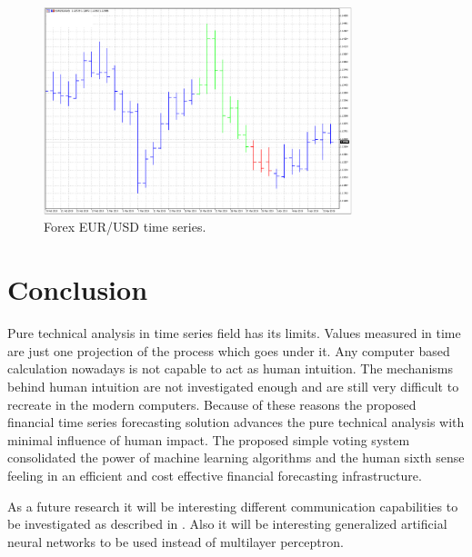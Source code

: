 \documentclass[runningheads]{llncs}
\begin{document}
\begin{figure}
\includegraphics[width=0.8\textwidth]{fig03.png}
\centering
\caption{Forex EUR/USD time series.} \label{fig03}
\end{figure}
\FloatBarrier

\section{Conclusion} \label{Conclusion}

Pure technical analysis in time series field has its limits. Values measured in time are just one projection of the process which goes under it. Any computer based calculation nowadays is not capable to act as human intuition. The mechanisms behind human intuition are not investigated enough and are still very difficult to recreate in the modern computers. Because of these reasons the proposed financial time series forecasting solution advances the pure technical analysis with minimal influence of human impact. The proposed simple voting system consolidated the power of machine learning algorithms and the human sixth sense feeling in an efficient and cost effective financial forecasting infrastructure.

As a future research it will be interesting different communication capabilities to be investigated as described in \cite{alexandrov01}. Also it will be interesting generalized artificial neural networks \cite{tashev01} to be used instead of multilayer perceptron.
\end{document}
